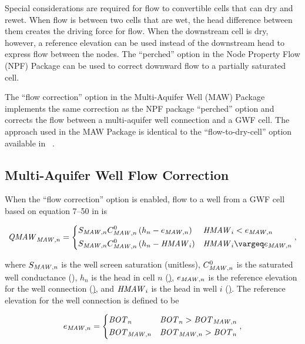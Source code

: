 Special considerations are required for flow to convertible cells that can dry and rewet. When flow is between two cells that are wet, the head difference between them creates the driving force for flow. When the downstream cell is dry,
however, a reference elevation can be used instead of the downstream head to express flow between the nodes. The ``perched'' option in the Node Property Flow (NPF) Package can be used to correct downward flow to a partially saturated cell.

The ``flow correction'' option in the Multi-Aquifer Well (MAW) Package implements the same correction as the NPF package ``perched'' option and corrects the flow between a multi-aquifer well connection and a GWF cell. The approach used in the MAW Package is identical to the ``flow-to-dry-cell'' option available in \mfu~\citep{modflowusg}.

\subsection{Multi-Aquifer Well Flow Correction}

When the ``flow correction'' option is enabled, flow to a well from a GWF cell based on equation 7--50 in \cite{modflow6gwf} is

\begin{align}
	\label{eqn:mawQ}
	\mli{QMAW}_{\mli{MAW},n} = \begin{dcases}
		S_{\mli{MAW},n} C_{\mli{MAW},n}^0 \left( h_n - e_{\mli{MAW},n} \right) &  \mli{HMAW}_i < e_{\mli{MAW},n} \\
		S_{\mli{MAW},n} C_{\mli{MAW},n}^0 \left( h_n - \mli{HMAW}_{i} \right) & \mli{HMAW}_i \ge e_{\mli{MAW},n}
	\end{dcases} ,
\end{align}

\noindent where $S_{\mathit{MAW},n}$ is the well screen saturation (unitless), $C_{\mathit{MAW},n}^0$ is the saturated well conductance (\ulst), $h_n$ is the head in cell $n$ (\ul), $e_{\mathit{MAW},n}$ is the reference elevation for the well connection (\ul), and $\mathit{HMAW}_{i}$ is the head in well $i$ (\ul). The reference elevation for the well connection is defined to be

\begin{equation}
	\label{en}
	e_{\mathit{MAW},n} = \begin{dcases}
		\mathit{BOT}_n &  \mathit{BOT}_n > \mathit{BOT}_{\mathit{MAW},n} \\
		\mathit{BOT}_{\mathit{MAW},n} &  \mathit{BOT}_{\mathit{MAW},n} > \mathit{BOT}_n
	\end{dcases} ,
\end{equation}

